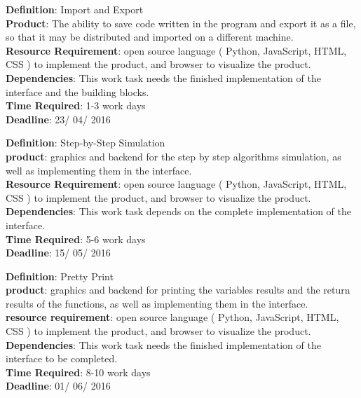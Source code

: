 \documentclass[11pt]{article}
\begin{document}
\noindent\textbf{Definition}: Import and Export \\
\textbf{Product}: The ability to save code written in the program and export it as a file, so that it may be distributed and imported on a different machine.\\
\textbf{Resource Requirement}: open source language ( Python, JavaScript, HTML, CSS ) to implement the product, and browser to visualize the product. \\
\textbf{Dependencies}: This work task needs the finished implementation of the interface and the building blocks.\\
\textbf{Time Required}: 1-3 work days\\
\textbf{Deadline}: 23/ 04/ 2016\\
\noindent\makebox[\linewidth]{\rule{\paperwidth}{0.4pt}}

\noindent\textbf{Definition}:  Step-by-Step Simulation\\
\textbf{product}: graphics and backend for the step by step  algorithms simulation, as well as implementing them in the interface.\\
\textbf{Resource Requirement}: open source language ( Python, JavaScript, HTML, CSS ) to implement the product, and browser to visualize the product. \\
\textbf{Dependencies}: This work task depends on the complete implementation of the interface.\\
\textbf{Time Required}: 5-6 work days\\
\textbf{Deadline}: 15/ 05/ 2016\\
\noindent\makebox[\linewidth]{\rule{\paperwidth}{0.4pt}}

\noindent\makebox[\linewidth]{\rule{\paperwidth}{0.4pt}}
\noindent\textbf{Definition}:  Pretty Print\\
\textbf{product}: graphics and backend for printing the variables results and the return results of the functions, as well as implementing them in the interface.\\
\textbf{resource requirement}: open source language ( Python, JavaScript, HTML, CSS ) to implement the product, and browser to visualize the product. \\
\textbf{Dependencies}: This work task needs the finished implementation of the interface to be completed.\\
\textbf{Time Required}: 8-10 work days\\
\textbf{Deadline}: 01/ 06/ 2016\\
\noindent\makebox[\linewidth]{\rule{\paperwidth}{0.4pt}}
\end{document}
